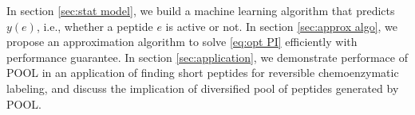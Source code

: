 \documentclass[11pt]{article}
\newcommand{\Prob}{\mathbb{P}}
\newcommand{\PI}{\text{PI}}
\newcommand{\pfcomment}[1]{{\color{blue} PF: #1}}
\begin{document}



In section \ref{sec:stat model}, we build a machine learning algorithm that predicts
$y(e)$, i.e., whether a peptide $e$ is active or not. In section \ref{sec:approx algo},
we propose an approximation algorithm to solve \eqref{eq:opt PI} efficiently with 
performance guarantee. In section \ref{sec:application}, we demonstrate performace
of POOL in an application of finding short peptides for reversible chemoenzymatic
labeling, and discuss the implication of diversified pool of peptides generated 
by POOL.
\end{document}
